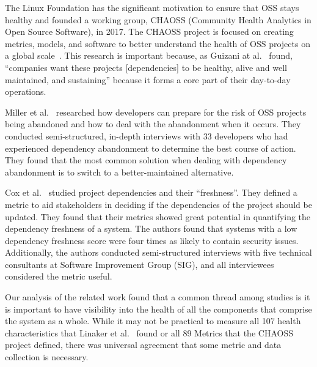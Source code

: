 \documentclass[sn-mathphys-num]{sn-jnl}%
\theoremstyle{thmstyleone}%
\theoremstyle{thmstyletwo}%
\theoremstyle{thmstylethree}%
\begin{document}
The Linux Foundation has the significant motivation to ensure that OSS stays healthy and founded a working group, CHAOSS (Community Health Analytics in Open Source Software), in 2017. The CHAOSS project is focused on creating metrics, models, and software to better understand the health of OSS projects on a global scale~\cite{noauthor_chaoss_nodate}. This research is important because, as  Guizani at al.~\cite{guizani_rules_2023} found, ``companies want these projects [dependencies] to be healthy, alive and well maintained, and sustaining'' because it forms a core part of their day-to-day operations.

Miller et al.~\cite{miller_we_2023} researched how developers can prepare for the risk of OSS projects being abandoned and how to deal with the abandonment when it occurs. They conducted semi-structured, in-depth interviews with 33 developers who had experienced dependency abandonment to determine the best course of action. They found that the most common solution when dealing with dependency abandonment is to switch to a better-maintained alternative.

Cox et al.~\cite{cox_measuring_2015} studied project dependencies and their ``freshness''. They defined a metric to aid stakeholders in deciding if the dependencies of the project should be updated. They found that their metrics showed great potential in quantifying the dependency freshness of a system. The authors found that systems with a low dependency freshness score were four times as likely to contain security issues. Additionally, the authors conducted semi-structured interviews with five technical consultants at Software Improvement Group (SIG), and all interviewees considered the metric useful.

Our analysis of the related work found that a common thread among studies is it is important to have visibility into the health of all the components that comprise the system as a whole. While it may not be practical to measure all 107 health characteristics that Linaker et al.~\cite{linaker_how_2022} found or all 89 Metrics that the CHAOSS~\cite{noauthor_chaoss_nodate} project defined, there was universal agreement that some metric and data collection is necessary.

\end{document}
